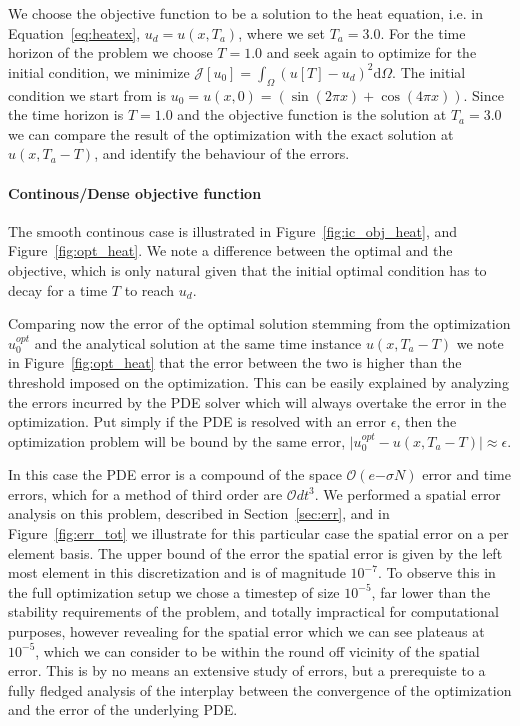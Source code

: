 \documentclass[10pt]{article}
\renewcommand{\d}{\mathrm{d}}
\begin{document}
We choose the objective function to be a solution to the heat equation, i.e. in Equation~\ref{eq:heatex}, $u_d=u(x,T_a)$, where we set $T_a=3.0$. For the time horizon of the problem we choose $T=1.0$ and seek again to optimize for the initial condition, we minimize $\mathcal J[u_0]=\int_{\Omega} (u[T]-u_d)^2 \d \Omega$. The initial condition we start from is $u_0=u(x,0)=(\sin(2\pi x)+\cos(4\pi x))$. Since the time horizon is $T=1.0$ and the objective function is the solution at $T_a=3.0$ we can compare the result of the optimization with the exact solution at $u(x,T_a-T)$, and identify the behaviour of the errors.

\paragraph{Continous/Dense objective function} 
The smooth continous case is illustrated in Figure~\ref{fig:ic_obj_heat}, and Figure~\ref{fig:opt_heat}. We note a difference between the optimal and the objective, which is only natural given that the initial optimal condition has to decay for a time $T$ to reach $u_d$.

Comparing now the error of the optimal solution stemming from the optimization $u_0^{opt}$ and the analytical solution at the same time instance $u(x,T_a-T)$ we note in Figure~\ref{fig:opt_heat} that the error between the two is higher than the threshold imposed on the optimization. This can be easily explained by analyzing the errors incurred by the PDE solver which will always overtake the error in the optimization. Put simply if the PDE is resolved with an error $\epsilon$, then the optimization problem will be bound by the same error, $\vert u_0^{opt} -u(x,T_a-T)\vert \approx \epsilon $. 

In this case the PDE error is a compound of the space $\mathcal O(e{-\sigma N})$ error and time errors, which for a method of third order are $\mathcal O{dt^3}$. We performed a spatial error analysis on this problem, described in Section~\ref{sec:err}, and in Figure~\ref{fig:err_tot} we illustrate for this particular case the spatial error on a per element basis. The upper bound of the error the spatial error is given by the left most element in this discretization and is of magnitude $10^{-7}$. To observe this in the full optimization setup we chose a timestep of size $10^{-5}$, far lower than the stability requirements of the problem, and totally impractical for computational purposes, however revealing for the spatial error which we can see plateaus at $10^{-5}$, which we can consider to be within the round off vicinity of the spatial error. This is by no means an extensive study of errors, but a prerequiste to a fully fledged analysis of the interplay between the convergence of the optimization and the error of the underlying PDE.
\end{document}
